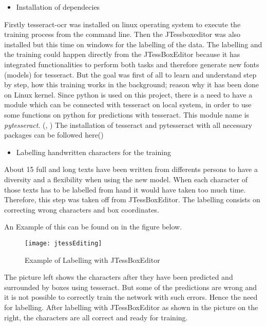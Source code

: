 \begin{itemize} \bfseries
	\item Installation of dependecies
\end{itemize}
Firstly tesseract-ocr was installed on linux operating system to execute the training process from the command line. 
Then the JTessboxeditor was also installed but this time on windows for the labelling of the data. 
The labelling and the training could happen directly from the JTessBoxEditor because it has integrated functionalities 
to perform both tasks and therefore generate new fonts (models) for tesseract.
But the goal was first of all to learn and understand step by step, how this training works in the background; reason why it has 
been done on Linux kernel.
Since python is used on this project, there is a need to have a module which can be connected with tesseract on local system, 
in order to use some functions on python for predictions with tesseract. 
This module name is \emph{pytesseract}. (\cite{[9]}, \cite{[8]})
The installation of tesseract and pytesseract with all necessary packages can be followed here(\cite{[9]})

\begin{itemize} \bfseries
	\item Labelling handwritten characters for the training
\end{itemize}
About 15 full and long texts have been written from differents persons to have a diversity and a flexibility when using the new model.
When each character of those texts has to be labelled from hand it would have taken too much time. 
Therefore, this step was taken off from JTessBoxEditor.
The labelling consists on correcting wrong characters and box coordinates.

An Example of this can be found on in the figure below.

\begin{figure}[htb]
	\centering
	\texttt{[image: jtessEditing]}
	\caption[Labelling with JTEssboxEditor]{Example of Labelling with JTessBoxEditor} \label{Abb:jtess_editing}
\end{figure}

The picture left shows the characters after they have been predicted and surrounded by boxes using tesseract. 
But some of the predictions are wrong and it is not possible to correctly train the network with such errors. 
Hence the need for labelling.
After labelling with JTessBoxEditor as shown in the picture on the right, the characters are all correct and ready for training. 

